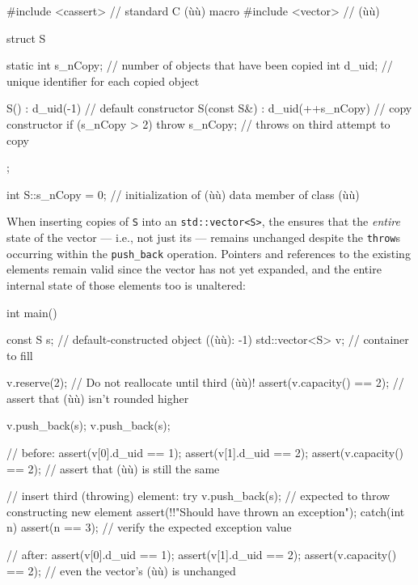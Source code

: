 \begin{emcppslisting}[emcppsbatch=e15]
#include <cassert>  // standard C (ù{}ù) macro
#include <vector>   // (ù{}ù)

struct S
{
    static int s_nCopy;  // number of objects that have been copied
    int        d_uid;    // unique identifier for each copied object

    S()         : d_uid(-1) { }     // default constructor
    S(const S&) : d_uid(++s_nCopy)  // copy constructor
    {
        if (s_nCopy > 2) throw s_nCopy;  // throws on third attempt to copy
    }
};

int S::s_nCopy = 0; // initialization of (ù{}ù) data member of class (ù{}ù)
\end{emcppslisting}
    

\noindent When inserting copies of \lstinline!S! into an \lstinline!std::vector<S>!, the
 ensures that the \emph{entire} state of the
vector --- i.e., not just its  --- remains
unchanged despite the \lstinline!throw!s occurring within the
\lstinline!push_back! operation. Pointers and references to the existing
elements remain valid since the vector has not yet expanded, and the
entire internal state of those elements too is unaltered:

\begin{emcppslisting}[emcppsbatch=e15]
int main()
{
    const S s;                  // default-constructed object ((ù{}ù): -1)
    std::vector<S> v;           // container to fill

    v.reserve(2);               // Do not reallocate until third (ù{}ù)!
    assert(v.capacity() == 2);  // assert that (ù{}ù) isn't rounded higher

    v.push_back(s);
    v.push_back(s);

    // before:
    assert(v[0].d_uid == 1);
    assert(v[1].d_uid == 2);
    assert(v.capacity() == 2);  // assert that (ù{}ù) is still the same

    // insert third (throwing) element:
    try
    {
        v.push_back(s);          // expected to throw constructing new element
        assert(!!"Should have thrown an exception");
    }
    catch(int n)
    {
        assert(n == 3);         // verify the expected exception value
    }

    // after:
    assert(v[0].d_uid == 1);
    assert(v[1].d_uid == 2);
    assert(v.capacity() == 2);  // even the vector's (ù{}ù) is unchanged
}
\end{emcppslisting}
    

